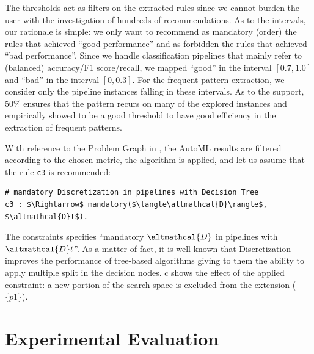 The thresholds act as filters on the extracted rules since we cannot burden the user with the investigation of hundreds of recommendations. 
As to the intervals, our rationale is simple: we only want to recommend as mandatory (order) the rules that achieved ``good performance'' and as forbidden the rules that achieved ``bad performance''.
Since we handle classification pipelines that mainly refer to (balanced) accuracy/F1 score/recall, we mapped ``good'' in the interval $[0.7, 1.0]$ and ``bad'' in the interval $[0, 0.3]$. For the frequent pattern extraction, we consider only the pipeline instances falling in these intervals.
As to the support, 50\% ensures that the pattern recurs on many of the explored instances and empirically showed to be a good threshold to have good efficiency in the extraction of frequent patterns.

\begin{example}
With reference to the Problem Graph in ,
the AutoML results are filtered according to the chosen metric, the algorithm \cite{raschkas_2018_mlxtend} is applied, and let us assume that the rule \texttt{c3} is recommended:
\begin{lstlisting}[mathescape=true]
# mandatory Discretization in pipelines with Decision Tree
c3 : $\Rightarrow$ mandatory($\langle\altmathcal{D}\rangle$, $\altmathcal{D}t$).
\end{lstlisting}
The constraints specifies ``mandatory $\altmathcal{D}$ in pipelines with $\altmathcal{D}t$''.
As a matter of fact, it is well known that Discretization improves the performance of tree-based algorithms giving to them the ability to apply multiple split in the decision nodes.
c shows the effect of the applied constraint: a new portion of the search space is excluded from the extension ($\{p1\}$).
\end{example}


\section{Experimental Evaluation}\label{hamlet-sec:test}

